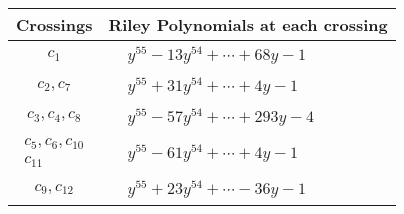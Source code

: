 \documentclass[1p]{elsarticle_modified}
\theoremstyle{definition}
\begin{document}
\begin{tabular}{m{50pt}|m{274pt}}
Crossings & \hspace{64pt}Riley Polynomials at each crossing \\
\hline $$\begin{aligned}c_{1}\end{aligned}$$&$\begin{aligned}
&y^{55}-13 y^{54}+\cdots+68 y-1
\end{aligned}$\\
\hline $$\begin{aligned}c_{2},c_{7}\end{aligned}$$&$\begin{aligned}
&y^{55}+31 y^{54}+\cdots+4 y-1
\end{aligned}$\\
\hline $$\begin{aligned}c_{3},c_{4},c_{8}\end{aligned}$$&$\begin{aligned}
&y^{55}-57 y^{54}+\cdots+293 y-4
\end{aligned}$\\
\hline $$\begin{aligned}c_{5},c_{6},c_{10}\\c_{11}\end{aligned}$$&$\begin{aligned}
&y^{55}-61 y^{54}+\cdots+4 y-1
\end{aligned}$\\
\hline $$\begin{aligned}c_{9},c_{12}\end{aligned}$$&$\begin{aligned}
&y^{55}+23 y^{54}+\cdots-36 y-1
\end{aligned}$\\
\hline
\end{tabular}
\vskip 2pc
\end{document}
